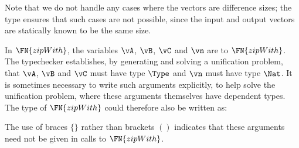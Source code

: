 Note that we do not handle any cases where the vectors are difference
sizes; the type ensures that such cases are not possible, since the
input and output vectors are statically known to be the same size.

In $\FN{zipWith}$, the variables $\vA$, $\vB$, $\vC$ and $\vn$ are
 to $\FN{zipWith}$. The typechecker
establishes, by generating and solving a unification problem, that
$\vA$, $\vB$ and $\vC$ must have type $\Type$ and $\vn$ must have type
$\Nat$. It is sometimes necessary to write such arguments explicitly,
to help solve the unification problem, where these arguments
themselves have dependent types. The type of $\FN{zipWith}$
could therefore also be written as:


\noindent
The use of braces $\{\}$ rather than brackets $()$ indicates that
these arguments need not be given in calls to $\FN{zipWith}$.

